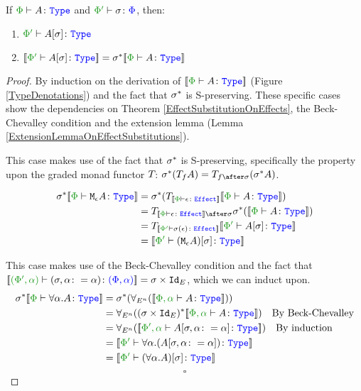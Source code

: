 \documentclass{Report}
\begin{document}
\begin{framed}
    \begin{theorem}\label{EffectSubstitutionOnTypes}
       If $\wellformedtype{\P}{A}$ and $\typerelation{\P'}{\si}{\P}$, then:
       \begin{enumerate}[label=\roman*.]
           \item $\wellformedtype{\P'}{A\ssi}$
           \item $\deno{\wellformedtype{\P'}{A\ssi}} = \si\star\deno{\wellformedtype{\P}{A}}$
       \end{enumerate}
    \end{theorem}
    
    \begin{proof}
       By induction on the derivation of $\deno{\wellformedtype{\P}{A}}$ (Figure \ref{TypeDenotations}) and the fact that $\sigma^*$ is S-preserving. These specific cases show the dependencies on Theorem \ref{EffectSubstitutionOnEffects}, the Beck-Chevalley condition and the extension lemma (Lemma \ref{ExtensionLemmaOnEffectSubstitutions}).
    
        \case{\teffect}
        This case makes use of the fact that $\sigma^*$ is S-preserving, specifically the property upon the graded monad functor $T_{}{}$: $\si\star(\T{f}{A}) = \T{f\after\si}{(\si\star A)}$.
    
    
        \begin{align*}
            \si\star\deno{\typerelation{\P}{\mea}{\type}} & =  \si\star(\T{\deno{\typerelation{\P}{\e}{\effect}}}{\deno{\typerelation{\P}{A}{\type}}})\\
            &= \T{\deno{\typerelation{\P}{\e}{\effect}}\after\si}{\si\star(\deno{\typerelation{\P}{A}{\type}})}\\
            & = \T{\deno{\wellformedeffect{\P'}{\si(\e)}}}{\deno{\wellformedtype{\P'}{A\ssi}}}\\
            & = \deno{\typerelation{\P'}{(\mea)\ssi}{\type}}
        \end{align*}
        
        \case{\tquant}
        This case makes use of the Beck-Chevalley condition and the fact that $\deno{\typerelation{(\P', \a)}{(\si, \a\setto\a)}{(\P, \a)}} = \si\times\Id{E}$, which we can induct upon.
            \begin{align*}
                \si\star\deno{\typerelation{\P}{\all{\a}A}{\type}} & = \si\star(\allEn(\deno{\typerelation{\P,\a}{A}{\type}}))\\
                & = \allEn((\si\times\Id{E})\star\deno{\typerelation{\P,\a}{A}{\type}})\qt{By Beck-Chevalley}\\
                & = \allEn(\deno{\typerelation{\P',\a}{A\sub{\si, \a\setto\a}}{\type}})\qt{By induction}\\
                & = \deno{\typerelation{\P'}{\all{\a}{(A\sub{\si, \a\setto\a})}}{\type}}\\
                & = \deno{\typerelation{\P'}{(\all{\a}{A})\ssi}{\type}}\\
            \end{align*}
            $$\square$$
    \end{proof}
\end{framed}
\end{document}
